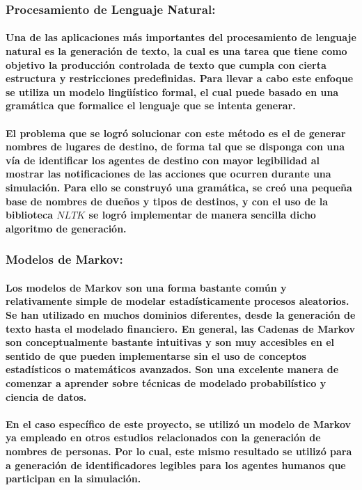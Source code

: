 \documentclass[12pt]{amsart}
\begin{document}
\subsubsection{Procesamiento de Lenguaje Natural:}

\paragraph{Una de las aplicaciones más importantes del procesamiento de lenguaje natural es la generación de texto, la cual es una tarea que tiene como objetivo la producción controlada de texto que cumpla con cierta estructura y restricciones predefinidas. Para llevar a cabo este enfoque se utiliza un modelo lingüístico formal, el cual puede basado en una gramática que formalice el lenguaje que se intenta generar.}

\paragraph{El problema que se logró solucionar con este método es el de generar nombres de lugares de destino, de forma tal que se disponga con una vía de identificar los agentes de destino con mayor legibilidad al mostrar las notificaciones de las acciones que ocurren durante una simulación. Para ello se construyó una gramática, se creó una pequeña base de nombres de dueños y tipos de destinos, y con el uso de la biblioteca $NLTK$ se logró implementar de manera sencilla dicho algoritmo de generación.}

\subsubsection{Modelos de Markov:}

\paragraph{Los modelos de Markov son una forma bastante común y relativamente simple de modelar estadísticamente procesos aleatorios. Se han utilizado en muchos dominios diferentes, desde la generación de texto hasta el modelado financiero. En general, las Cadenas de Markov son conceptualmente bastante intuitivas y son muy accesibles en el sentido de que pueden implementarse sin el uso de conceptos estadísticos o matemáticos avanzados. Son una excelente manera de comenzar a aprender sobre técnicas de modelado probabilístico y ciencia de datos.}

\paragraph{En el caso específico de este proyecto, se utilizó un modelo de Markov \cite{markovm} ya empleado en otros estudios relacionados con la generación de nombres de personas. Por lo cual, este mismo resultado se utilizó para a generación de identificadores legibles para los agentes humanos que participan en la simulación.}
\end{document}
